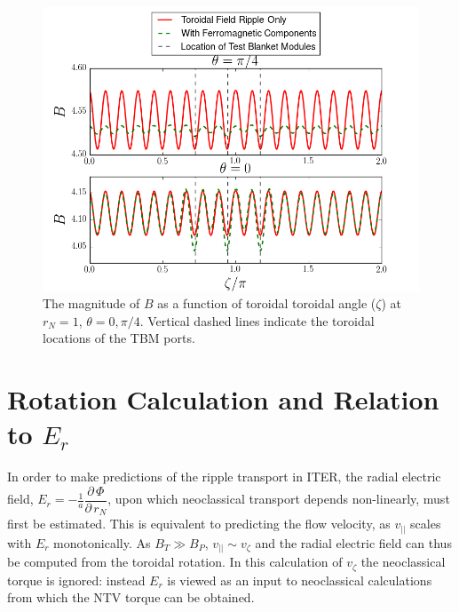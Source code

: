 \documentclass{article}
\newcommand{\partder}[2]{\dfrac{\partial \, #1}{\partial \, #2}} %
\begin{document}
\begin{figure}[h!]
\centering
\includegraphics[width=1\textwidth]{toroidalripple.png}
\caption{\label{fig:toroidalripple} The magnitude of $B$ as a function of toroidal toroidal angle ($\zeta$) at $r_N = 1$, $\theta = 0, \pi/4$. Vertical dashed lines indicate the toroidal locations of the TBM ports.}
\end{figure}

\FloatBarrier

\section{Rotation Calculation and Relation to $E_r$}

In order to make predictions of the ripple transport in ITER, the radial electric field, $E_r = - \frac{1}{a} \partder{\Phi}{r_N}$, upon which neoclassical transport depends non-linearly, must first be estimated. This is equivalent to predicting the flow velocity, as $v_{||}$ scales with $E_r$ monotonically. 
As $B_T \gg B_P$, $v_{||} \sim v_{\zeta}$ and the radial electric field can thus be computed from the toroidal rotation. In this calculation of $v_{\zeta}$ the neoclassical torque is ignored: instead $E_r$ is viewed as an input to neoclassical calculations from which the NTV torque can be obtained. 
\end{document}
